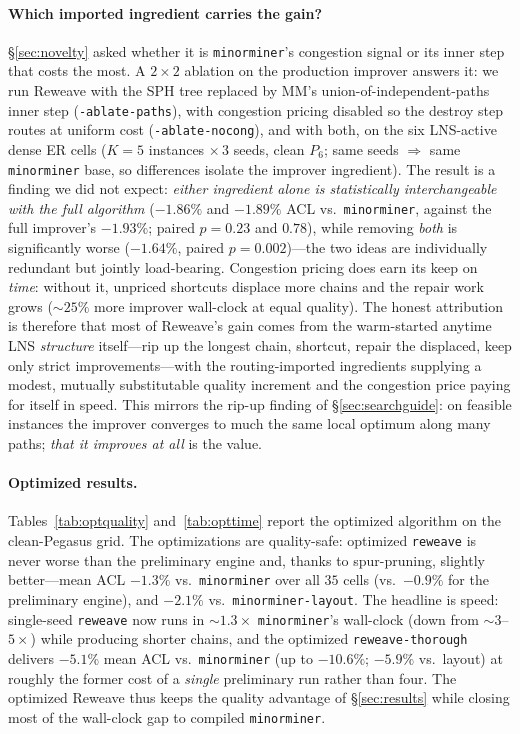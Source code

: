 \documentclass[acmsmall,anonymous,nonacm]{acmart}
\begin{document}
\paragraph{Which imported ingredient carries the gain?} \S\ref{sec:novelty} asked
whether it is \texttt{minorminer}'s congestion signal or its inner step that costs
the most. A $2{\times}2$ ablation on the production improver answers it: we run
Reweave with the SPH tree replaced by MM's union-of-independent-paths inner step
(\texttt{-ablate-paths}), with congestion pricing disabled so the destroy step
routes at uniform cost (\texttt{-ablate-nocong}), and with both, on the six
LNS-active dense ER cells ($K{=}5$ instances $\times\,3$ seeds, clean $P_6$; same
seeds $\Rightarrow$ same \texttt{minorminer} base, so differences isolate the
improver ingredient). The result is a finding we did not expect: \emph{either
ingredient alone is statistically interchangeable with the full algorithm}
($-1.86\%$ and $-1.89\%$ ACL vs.\ \texttt{minorminer}, against the full improver's
$-1.93\%$; paired $p=0.23$ and $0.78$), while removing \emph{both} is
significantly worse ($-1.64\%$, paired $p=0.002$)---the two ideas are individually
redundant but jointly load-bearing. Congestion pricing does earn its keep on
\emph{time}: without it, unpriced shortcuts displace more chains and the repair
work grows (${\sim}25\%$ more improver wall-clock at equal quality). The honest
attribution is therefore that most of Reweave's gain comes from the warm-started
anytime LNS \emph{structure} itself---rip up the longest chain, shortcut, repair
the displaced, keep only strict improvements---with the routing-imported
ingredients supplying a modest, mutually substitutable quality increment and the
congestion price paying for itself in speed. This mirrors the rip-up finding of
\S\ref{sec:searchguide}: on feasible instances the improver converges to much the
same local optimum along many paths; \emph{that it improves at all} is the value.

\paragraph{Optimized results.} Tables~\ref{tab:optquality} and~\ref{tab:opttime}
report the optimized algorithm on the clean-Pegasus grid. The optimizations are
quality-safe: optimized \texttt{reweave} is never worse than the preliminary
engine and, thanks to spur-pruning, slightly better---mean ACL $-1.3\%$ vs.\
\texttt{minorminer} over all $35$ cells (vs.\ $-0.9\%$ for the preliminary
engine), and $-2.1\%$ vs.\ \texttt{minorminer-layout}. The headline is speed:
single-seed \texttt{reweave} now runs in ${\sim}1.3\times$
\texttt{minorminer}'s wall-clock (down from ${\sim}3$--$5\times$) while producing
shorter chains, and the optimized \texttt{reweave-thorough} delivers $-5.1\%$
mean ACL vs.\ \texttt{minorminer} (up to $-10.6\%$; $-5.9\%$ vs.\ layout) at
roughly the former cost of a \emph{single} preliminary run rather than four. The
optimized Reweave thus keeps the quality advantage of \S\ref{sec:results}
while closing most of the wall-clock gap to compiled \texttt{minorminer}.
\end{document}
